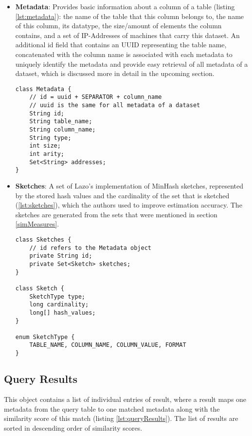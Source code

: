 \begin{itemize}
    \item \textbf{Metadata}: Provides basic information about a column of a table (listing \ref{lst:metadata}): the name of the table that this column belongs to, the name of this column, its datatype, the size/amount of elements the column contains, and a set of IP-Addresses of machines that carry this dataset. An additional id field that contains an UUID representing the table name, concatenated with the column name is associated with each metadata to uniquely identify the metadata and provide easy retrieval of all metadata of a dataset, which is discussed more in detail in the upcoming section.
    \begin{lstlisting}[caption={Preview of the metadata object}, label=lst:metadata]
class Metadata {
    // id = uuid + SEPARATOR + column_name
    // uuid is the same for all metadata of a dataset
    String id;
    String table_name;
    String column_name;
    String type;
    int size;
    int arity;
    Set<String> addresses;
}
    \end{lstlisting}
    \item \textbf{Sketches}: A set of Lazo's implementation of MinHash sketches, represented by the stored hash values and the cardinality of the set that is sketched (\ref{lst:sketches}), which the authors used to improve estimation accuracy. The sketches are generated from the sets that were mentioned in section \ref{simMeasures}.

\begin{lstlisting}[caption={Preview of the sketches object}, label=lst:sketches]
class Sketches {
    // id refers to the Metadata object
    private String id;
    private Set<Sketch> sketches;
}

class Sketch {
    SketchType type;
    long cardinality;
    long[] hash_values;
}

enum SketchType {
    TABLE_NAME, COLUMN_NAME, COLUMN_VALUE, FORMAT
}
    \end{lstlisting}
\end{itemize}

\subsection{Query Results}

This object contains a list of individual entries of result, where a result maps one metadata from the query table to one matched metadata along with the similarity score of this match (listing \ref{lst:queryResults}). The list of results are sorted in descending order of similarity scores.

